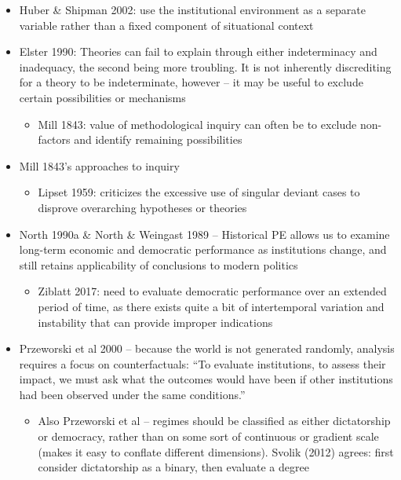 \documentclass[12pt]{article}
\begin{document}
\begin{itemize}
    \item Huber \& Shipman 2002: use the institutional environment as a separate variable rather than a fixed component of situational context
    \item Elster 1990: Theories can fail to explain through either indeterminacy and inadequacy, the second being more troubling. It is not inherently discrediting for a theory to be indeterminate, however -- it may be useful to exclude certain possibilities or mechanisms
    \begin{itemize}
        \item Mill 1843: value of methodological inquiry can often be to exclude non-factors and identify remaining possibilities
    \end{itemize}
    \item Mill 1843's approaches to inquiry
    \begin{itemize}
        \item Lipset 1959: criticizes the excessive use of singular deviant cases to disprove overarching hypotheses or theories
    \end{itemize}
    \item North 1990a \& North \& Weingast 1989 -- Historical PE allows us to examine long-term economic and democratic performance as institutions change, and still retains applicability of conclusions to modern politics
    \begin{itemize}
        \item Ziblatt 2017: need to evaluate democratic performance over an extended period of time, as there exists quite a bit of intertemporal variation and instability that can provide improper indications
    \end{itemize}
    \item Przeworski et al 2000 -- because the world is not generated randomly, analysis requires a focus on counterfactuals: ``To evaluate institutions, to assess their impact, we must ask what the outcomes would have been if other institutions had been observed under the same conditions.''
    \begin{itemize}
        \item Also Przeworski et al -- regimes should be classified as either dictatorship or democracy, rather than on some sort of continuous or gradient scale (makes it easy to conflate different dimensions). Svolik (2012) agrees: first consider dictatorship as a binary, then evaluate a degree
    \end{itemize}

\end{itemize}
\end{document}
